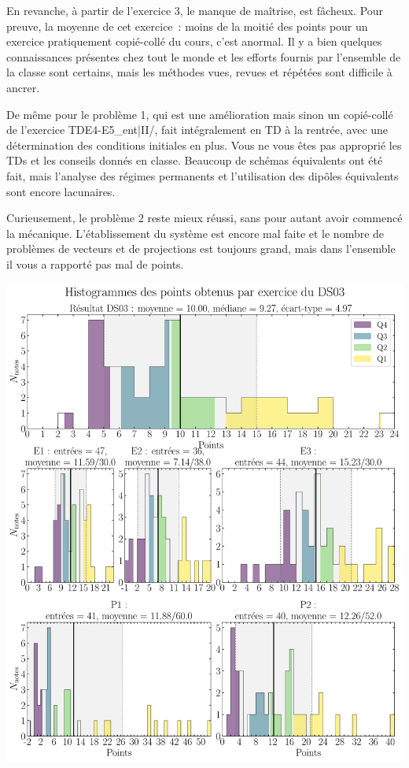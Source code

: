 \documentclass[a4paper, 10pt, final, garamond]{book}
\begin{document}
\noindent
\begin{isd}[righthand ratio=.7]
	En revanche, à partir de l'exercice 3, le manque de maîtrise, est fâcheux.
	Pour preuve, la moyenne de cet exercice~: moins de la moitié des points pour
	un exercice pratiquement copié-collé du cours, c'est anormal. Il y a bien
	quelques connaissances présentes chez tout le monde et les efforts fournis par
	l'ensemble de la classe sont certains, mais les méthodes vues, revues et
	répétées sont difficile à ancrer.

	De même pour le problème 1, qui est une amélioration mais sinon un copié-collé
	de l'exercice TDE4-E5\_ent|II/, fait intégralement en TD à la rentrée, avec
	une détermination des conditions initiales en plus. Vous ne vous êtes pas
	approprié les TDs et les conseils donnés en classe. Beaucoup de schémas
	équivalents ont été fait, mais l'analyse des régimes permanents et
	l'utilisation des dipôles équivalents sont encore lacunaires.

	Curieusement, le problème 2 reste mieux réussi, sans pour autant avoir
	commencé la mécanique. L'établissement du système est encore mal faite et le
	nombre de problèmes de vecteurs et de projections est toujours grand, mais
	dans l'ensemble il vous a rapporté pas mal de points.
	\tcblower
	\begin{center}
		\includegraphics[width=\linewidth]{DS03_hist_all.pdf}
	\end{center}
\end{isd}
\end{document}
